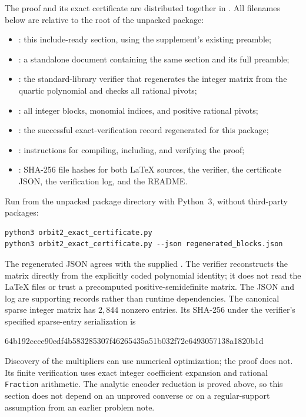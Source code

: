 The proof and its exact certificate are distributed together in
. All filenames below are relative
to the root of the unpacked package:
\begin{itemize}
\item {}:
this include-ready section, using the supplement's existing preamble;
\item {}:
a standalone document containing the same section and its full preamble;
\item {}:
the standard-library verifier that regenerates the integer matrix
from the quartic polynomial and checks all rational pivots;
\item {}:
all integer blocks, monomial indices, and positive rational pivots;
\item {}:
the successful exact-verification record regenerated for this package;
\item {}:
instructions for compiling, including, and verifying the proof;
\item {}:
SHA-256 file hashes for both LaTeX sources, the verifier, the certificate
JSON, the verification log, and the README.
\end{itemize}
Run from the unpacked package directory with Python~3, without
third-party packages:
\begin{verbatim}
python3 orbit2_exact_certificate.py
python3 orbit2_exact_certificate.py --json regenerated_blocks.json
\end{verbatim}
The regenerated JSON agrees with the supplied
. The verifier reconstructs the
matrix directly from the explicitly coded polynomial identity; it does
not read the LaTeX files or trust a precomputed positive-semidefinite
matrix. The JSON and log are supporting records rather than runtime
dependencies.
The canonical sparse integer matrix has \(2{,}844\) nonzero entries.
Its SHA-256 under the verifier's specified sparse-entry serialization is
\begin{center}
\small\ttfamily
64b192ccce90edf4b583285307f46265435a51b032f72e6493057138a1820b1d
\end{center}
Discovery of the multipliers can use numerical optimization; the proof
does not. Its finite verification uses exact integer coefficient
expansion and rational \texttt{Fraction} arithmetic. The analytic
encoder reduction is proved above, so this section does not depend
on an unproved converse or on a regular-support assumption from an
earlier problem note.
